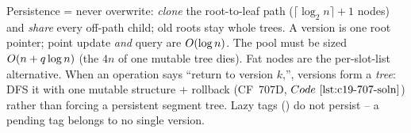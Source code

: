 \begin{recallbox}
Persistence = never overwrite: \emph{clone} the root-to-leaf path (\(\lceil\log_2 n\rceil{+}1\) nodes) and \emph{share} every off-path child; old roots stay whole trees.  A version is one root pointer; point update \emph{and} query are \(O(\log n)\).  The pool must be sized \(O(n+q\log n)\) (the \(4n\) of one mutable tree dies).  Fat nodes are the per-slot-list alternative.  When an operation says ``return to version \(k\),'', versions form a \emph{tree}: DFS it with one mutable structure + rollback (CF~707D, \(\coderef{c19-707-soln}\)) rather than forcing a persistent segment tree.  Lazy tags () do not persist -- a pending tag belongs to no single version.
\end{recallbox}
